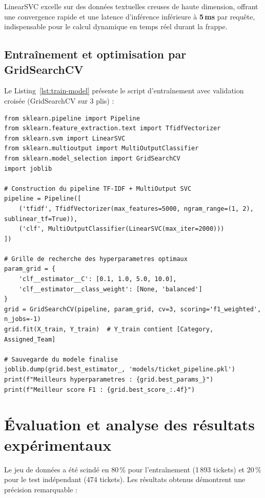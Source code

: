 \documentclass[12pt, a4paper, oneside]{report}
\begin{document}
LinearSVC excelle sur des données textuelles creuses de haute dimension, offrant une convergence rapide et une latence d'inférence inférieure à \textbf{5\,ms} par requête, indispensable pour le calcul dynamique en temps réel durant la frappe.

\subsection{Entraînement et optimisation par GridSearchCV}

Le Listing~\ref{lst:train-model} présente le script d'entraînement avec validation croisée (GridSearchCV sur 3 plis) :

\begin{lstlisting}[style=python, label={lst:train-model},
  caption={Entraînement du modèle multi-sorties -- \texttt{src/model.py}}]
from sklearn.pipeline import Pipeline
from sklearn.feature_extraction.text import TfidfVectorizer
from sklearn.svm import LinearSVC
from sklearn.multioutput import MultiOutputClassifier
from sklearn.model_selection import GridSearchCV
import joblib

# Construction du pipeline TF-IDF + MultiOutput SVC
pipeline = Pipeline([
    ('tfidf', TfidfVectorizer(max_features=5000, ngram_range=(1, 2), sublinear_tf=True)),
    ('clf', MultiOutputClassifier(LinearSVC(max_iter=2000)))
])

# Grille de recherche des hyperparametres optimaux
param_grid = {
    'clf__estimator__C': [0.1, 1.0, 5.0, 10.0],
    'clf__estimator__class_weight': [None, 'balanced']
}
grid = GridSearchCV(pipeline, param_grid, cv=3, scoring='f1_weighted', n_jobs=-1)
grid.fit(X_train, Y_train)  # Y_train contient [Category, Assigned_Team]

# Sauvegarde du modele finalise
joblib.dump(grid.best_estimator_, 'models/ticket_pipeline.pkl')
print(f"Meilleurs hyperparametres : {grid.best_params_}")
print(f"Meilleur score F1 : {grid.best_score_:.4f}")
\end{lstlisting}

\section{Évaluation et analyse des résultats expérimentaux}

Le jeu de données a été scindé en 80\,\% pour l'entraînement (1\,893 tickets) et 20\,\% pour le test indépendant (474 tickets). Les résultats obtenus démontrent une précision remarquable :
\end{document}
